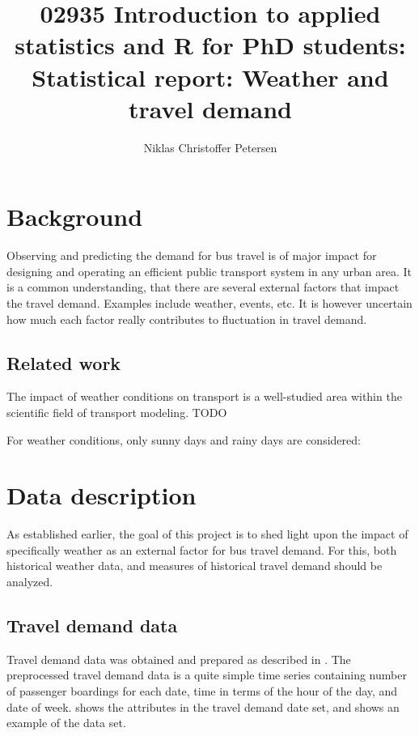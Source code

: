 \documentclass[a4paper,11pt]{article}
\title{{\small 02935 Introduction to applied statistics and R for PhD students: }\\[1em]Statistical report: Weather and travel demand}
\author{Niklas Christoffer Petersen}
\affil{Transport Modelling, Department of Management Engineering \\ Technical University of Denmark, 2800 Kongens Lyngby, Denmark}
\begin{document}
\singlespace
\maketitle
\thispagestyle{empty}
\clearpage

\onehalfspacing
{}
\tableofcontents
\clearpage
\glsaddall
\printglossaries


\clearpage

\section{Background}\label{ch:background}

Observing and predicting the demand for bus travel is of major impact for designing and operating an efficient public transport system in any urban area. It is a common understanding, that there are several external factors that impact the travel demand. Examples include weather, events, etc. It is however uncertain how much each factor really contributes to fluctuation in travel demand. 

\subsection{Related work}\label{ch:relatedWork}
The impact of weather conditions on transport is a well-studied area within the scientific field of transport modeling.
TODO

For weather conditions, only sunny days and rainy days are considered: \citet{Yo2010}

\clearpage

\section{Data description}\label{ch:desc}
As established earlier, the goal of this project is to shed light upon the impact of specifically weather as an external factor for bus travel demand. For this, both historical weather data, and measures of historical travel demand should be analyzed.

\subsection{Travel demand data}\label{ch:desc_traveldemand}

Travel demand data was obtained and prepared as described in . The preprocessed travel demand data is a quite simple time series containing number of passenger boardings for each date, time in terms of the hour of the day, and date of week.  shows the attributes in the travel demand date set, and  shows an example of the data set.
\end{document}
